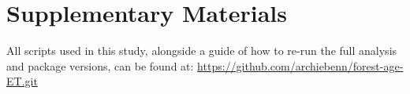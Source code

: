 
\section{Supplementary Materials}
All scripts used in this study, alongside a guide of how to re-run the full analysis and package versions, can be found at: \url{https://github.com/archiebenn/forest-age-ET.git}